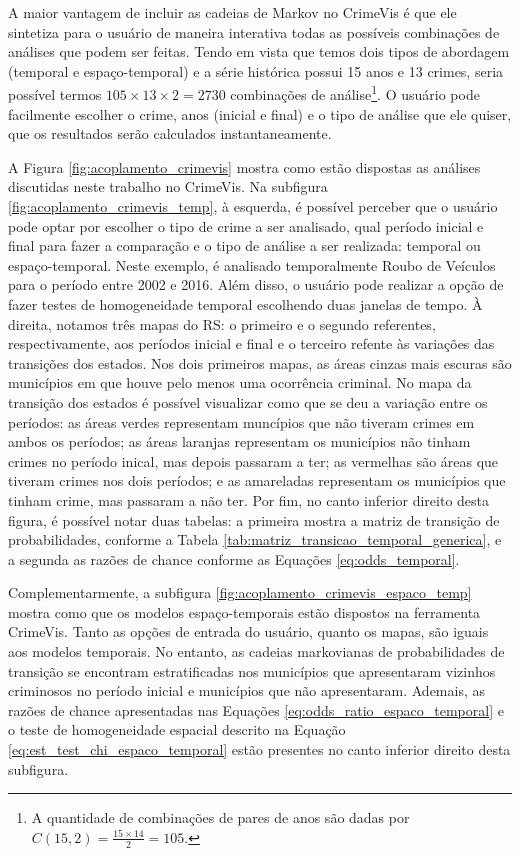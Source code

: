 \documentclass[12pt,openright,oneside,a4paper,english,french,spanish]{abntex2}
\numberwithin{table}{section} %
\numberwithin{figure}{section} %
\begin{document}
A maior vantagem de incluir as cadeias de Markov no CrimeVis é que ele sintetiza para o usuário de maneira interativa todas as possíveis combinações de análises que podem ser feitas. Tendo em vista que temos dois tipos de abordagem (temporal e espaço-temporal) e a série histórica possui 15 anos e 13 crimes, seria possível termos $105 \times 13 \times 2 = 2730$ combinações de análise\footnote{A quantidade de combinações de pares de anos são dadas por $C(15,2) = \frac{15 \times 14}{2} = 105$.}. O usuário pode facilmente escolher o crime, anos (inicial e final) e o tipo de análise que ele quiser, que os resultados serão calculados instantaneamente. 

A Figura \ref{fig:acoplamento_crimevis} mostra como estão dispostas as análises discutidas neste trabalho no CrimeVis. Na subfigura \ref{fig:acoplamento_crimevis_temp}, à esquerda, é possível perceber que o usuário pode optar por escolher o tipo de crime a ser analisado, qual período inicial e final para fazer a comparação e o tipo de análise a ser realizada: temporal ou espaço-temporal. Neste exemplo, é analisado temporalmente Roubo de Veículos para o período entre 2002 e 2016. Além disso, o usuário pode realizar a opção de fazer testes de homogeneidade temporal escolhendo duas janelas de tempo. À direita, notamos três mapas do RS: o primeiro e o segundo referentes, respectivamente, aos períodos inicial e final e o terceiro refente às variações das transições dos estados. Nos dois primeiros mapas, as áreas cinzas mais escuras são municípios em que houve pelo menos uma ocorrência criminal. No mapa da transição dos estados é possível visualizar como que se deu a variação entre os períodos: as áreas verdes representam muncípios que não tiveram crimes em ambos os períodos; as áreas laranjas representam os municípios não tinham crimes no período inical, mas depois passaram a ter; as vermelhas são áreas que tiveram crimes nos dois períodos; e as amareladas representam os municípios que tinham crime, mas passaram a não ter. Por fim, no canto inferior direito desta figura, é possível notar duas tabelas: a primeira mostra a matriz de transição de probabilidades, conforme a Tabela \ref{tab:matriz_transicao_temporal_generica}, e a segunda as razões de chance conforme as Equações \ref{eq:odds_temporal}. 

Complementarmente, a subfigura \ref{fig:acoplamento_crimevis_espaco_temp} mostra como que os modelos espaço-temporais estão dispostos na ferramenta CrimeVis. Tanto as opções de entrada do usuário, quanto os mapas, são iguais aos modelos temporais. No entanto, as cadeias markovianas de probabilidades de transição se encontram estratificadas nos municípios que apresentaram vizinhos criminosos no período inicial e municípios que não apresentaram. Ademais, as razões de chance apresentadas nas Equações \ref{eq:odds_ratio_espaco_temporal} e o teste de homogeneidade espacial descrito na Equação \ref{eq:est_test_chi_espaco_temporal} estão presentes no canto inferior direito desta subfigura.
\end{document}

